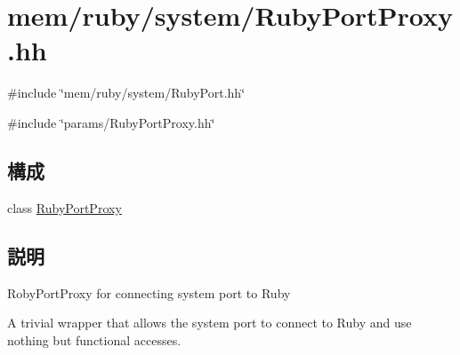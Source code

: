 \hypertarget{RubyPortProxy_8hh}{
\section{mem/ruby/system/RubyPortProxy.hh}
\label{RubyPortProxy_8hh}
}
{\ttfamily \#include \char`\"{}mem/ruby/system/RubyPort.hh\char`\"{}}\par
{\ttfamily \#include \char`\"{}params/RubyPortProxy.hh\char`\"{}}\par
\subsection*{構成}
\begin{DoxyCompactItemize}
\item 
class \hyperlink{classRubyPortProxy}{RubyPortProxy}
\end{DoxyCompactItemize}


\subsection{説明}
RobyPortProxy for connecting system port to Ruby

A trivial wrapper that allows the system port to connect to Ruby and use nothing but functional accesses. 